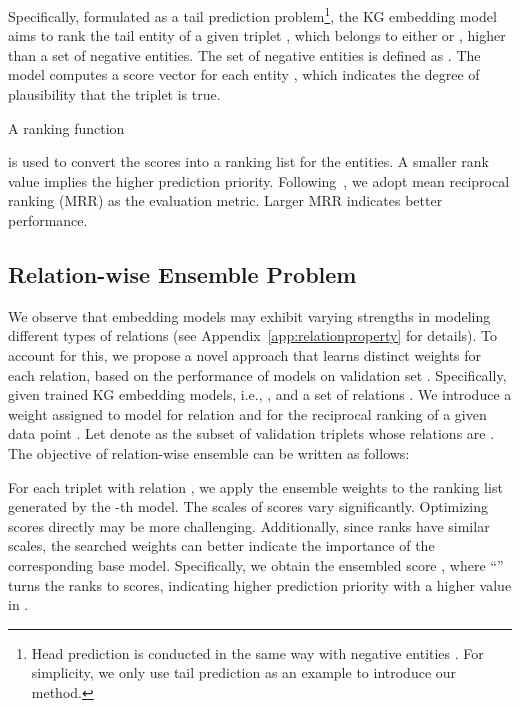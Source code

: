 \documentclass[11pt,a4paper]{article}
\begin{document}
  Specifically, formulated as a tail prediction problem\footnote{Head prediction is conducted in the same way
  	with negative entities
  	.
  	For simplicity,
  	we only use tail prediction as an example to introduce our method.}, the KG embedding model aims to rank the tail entity  of a given triplet , 
  which belongs to either  or , 
  higher than a set of negative entities.
  The set of negative entities is defined as 
  .
  The model  computes a score vector  for each entity 
  ,
  which indicates the degree of plausibility that the triplet  is true.
  
  A ranking function
    
  is used to convert the scores  into
  a ranking list 
  for the  entities.
  A smaller rank value implies the higher prediction priority.
  Following~\cite{bordes2013translating,trouillon2017knowledge,sun2019rotate,vashishth2019composition},
  we adopt mean reciprocal ranking (MRR) as the evaluation metric.
  Larger MRR indicates better performance.
  
  
  \subsection{Relation-wise Ensemble Problem}
  \label{ssec:relation-wise}
  
  We observe that
  embedding models may exhibit varying strengths in
  modeling different types of relations (see Appendix~\ref{app:relationproperty} for details).
  To account for this,
  we propose a novel approach that learns distinct weights for each relation, 
  based on the performance of models on validation set .
  Specifically,
  given  trained KG embedding models,
  i.e., 
  ,
  and a set  of relations .
  We introduce a weight  assigned to model  for relation  
  and  for the reciprocal ranking of a given data point .
  Let  denote as the subset of validation triplets whose relations are .
  The objective of relation-wise ensemble can be written as follows:
  
  For each triplet  with relation ,
  we apply the ensemble weights  
  to the ranking list  generated by the -th model.
  The scales of scores vary significantly. Optimizing scores directly may be more challenging. 
  Additionally, since ranks have similar scales,
  the searched weights can better indicate the importance of the corresponding base model.
  Specifically,
  we obtain the ensembled score ,
  where ``'' turns the ranks to scores, 
  indicating higher prediction priority with a higher value in .
  
\end{document}
